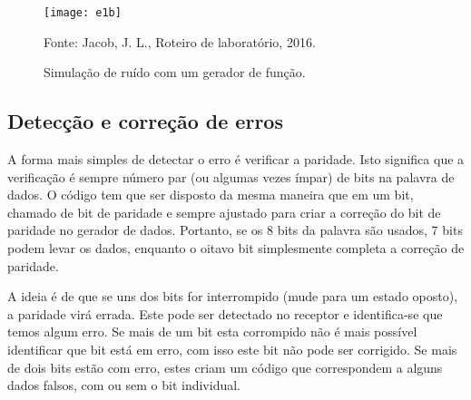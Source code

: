                 \newpage
                \begin{figure}[H]
                    \centering
                    \caption{Simulação de ruído com um gerador de função.}
                    \texttt{[image: e1b]}
                    
                    \small Fonte: Jacob, J. L., Roteiro de laboratório, 2016.
                    \label{fig:e1b}
                \end{figure}
            
        \subsection{Detecção e correção de erros}
                        A forma mais simples de detectar o erro é verificar a paridade. Isto significa que a verificação é sempre número par (ou algumas vezes ímpar) de bits na palavra de dados. O código tem que ser disposto da mesma maneira que em um bit, chamado de bit de paridade e sempre ajustado para criar a correção do bit de paridade no gerador de dados. Portanto, se os 8 bits da palavra são usados, 7 bits podem levar os dados, enquanto o oitavo bit simplesmente completa a correção de paridade.
                        
                        A ideia é de que se uns dos bits for interrompido (mude para um estado oposto), a paridade virá errada. Este pode ser detectado no receptor e identifica-se que temos algum erro.
            Se mais de um bit esta corrompido não é mais possível identificar que bit está em erro, com isso
            este bit não pode ser corrigido.
            Se mais de dois bits estão com erro, estes criam um código que correspondem a alguns dados
            falsos, com ou sem o bit individual.
            
